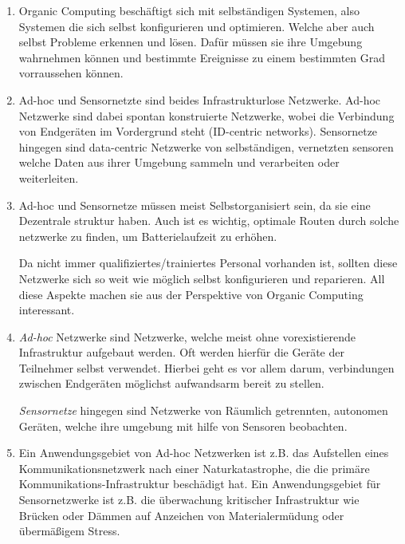 
\date{Sonntag 10.05.2020}


    \maketitle
    \thispagestyle{fancy}

    \begin{enumerate}[label=\arabic*)]
        \item Organic Computing beschäftigt sich mit selbständigen Systemen, also Systemen die sich selbst konfigurieren und optimieren. Welche aber auch selbst Probleme erkennen und lösen. Dafür müssen sie ihre Umgebung wahrnehmen können und bestimmte Ereignisse zu einem bestimmten Grad vorraussehen können. 

        \item Ad-hoc und Sensornetzte sind beides Infrastrukturlose Netzwerke. Ad-hoc Netzwerke sind dabei spontan konstruierte Netzwerke, wobei die Verbindung von Endgeräten im Vordergrund steht (ID-centric networks). Sensornetze hingegen sind data-centric Netzwerke von selbständigen, vernetzten sensoren welche Daten aus ihrer Umgebung sammeln und verarbeiten oder weiterleiten.
        
        \item Ad-hoc und Sensornetze müssen meist Selbstorganisiert sein, da sie eine Dezentrale struktur haben. Auch ist es wichtig, optimale Routen durch solche netzwerke zu finden, um Batterielaufzeit zu erhöhen. 
        
        Da nicht immer qualifiziertes/trainiertes Personal vorhanden ist, sollten diese Netzwerke sich so weit wie möglich selbst konfigurieren und reparieren. All diese Aspekte machen sie aus der Perspektive von Organic Computing interessant.
        \item \emph{Ad-hoc} Netzwerke sind Netzwerke, welche meist ohne vorexistierende Infrastruktur aufgebaut werden. Oft werden hierfür die Geräte der Teilnehmer selbst verwendet. Hierbei geht es vor allem darum, verbindungen zwischen Endgeräten möglichst aufwandsarm bereit zu stellen.
        
        \emph{Sensornetze} hingegen sind Netzwerke von Räumlich getrennten, autonomen Geräten, welche ihre umgebung mit hilfe von Sensoren beobachten. 

        \item Ein Anwendungsgebiet von Ad-hoc Netzwerken ist z.B. das Aufstellen eines Kommunikationsnetzwerk nach einer Naturkatastrophe, die die primäre Kommunikations-Infrastruktur beschädigt hat. Ein Anwendungsgebiet für Sensornetzwerke ist z.B. die überwachung kritischer Infrastruktur wie Brücken oder Dämmen auf Anzeichen von Materialermüdung oder übermäßigem Stress.
    \end{enumerate}

